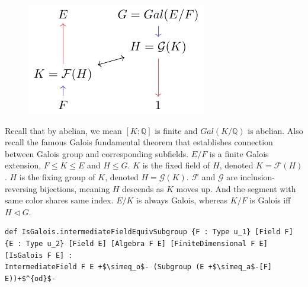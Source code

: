 \begin{figure}
    \includegraphics{Figures/figure5.pdf}
\end{figure}
\noindent
Recall that by abelian, we mean $[K : \mathbb{Q}]$ is finite and $Gal(K/\mathbb{Q})$ is abelian. Also recall the famous Galois fundamental theorem that establishes connection between Galois group and corresponding subfields.
\newline
$E/F$ is a finite Galois extension, $F \leq K \leq E$ and $H \leq G$. $K$ is the fixed field of $H$, denoted $K=\mathcal{F}(H)$. $H$ is the fixing group of $K$, denoted $H=\mathcal{G}(K)$. $\mathcal{F}$ and $\mathcal{G}$ are inclusion-reversing bijections, meaning $H$ descends as $K$ moves up. And the segment with same color shares same index. $E/K$ is always Galois, whereas $K/F$ is Galois iff $H \lhd G$.
\begin{listing}[!htpb]
\begin{verbatim}
def IsGalois.intermediateFieldEquivSubgroup {F : Type u_1} [Field F] {E : Type u_2} [Field E] [Algebra F E] [FiniteDimensional F E] [IsGalois F E] :
IntermediateField F E +$\simeq_o$- (Subgroup (E +$\simeq_a$-[F] E))+$^{od}$-
\end{verbatim}
\end{listing}
\newline
